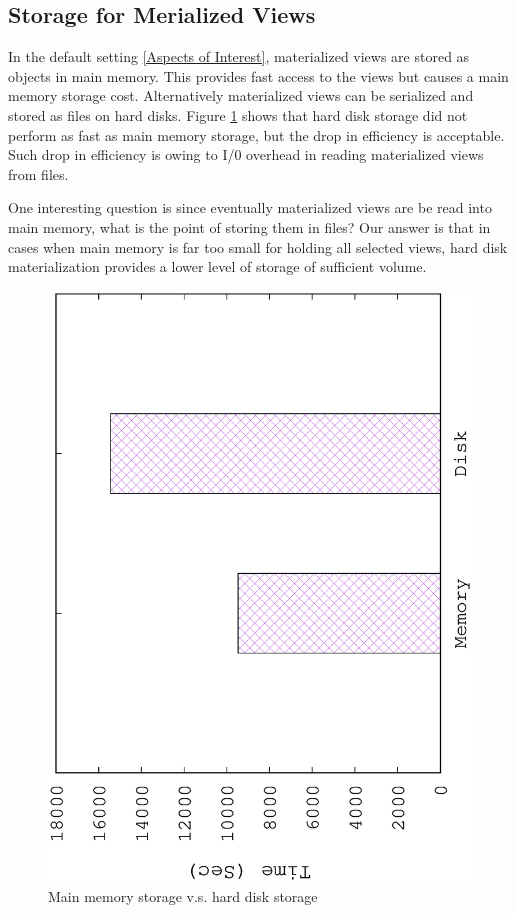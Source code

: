 \subsection{Storage for Merialized Views}
In the default setting \ref{Aspects of Interest}, materialized views are stored as objects in main memory. This provides fast access to the views but causes a main memory storage cost. Alternatively materialized views can be serialized and stored as files on hard disks. Figure \ref{fig:disk} shows that hard disk storage did not perform as fast as main memory storage, but the drop in efficiency is acceptable. Such drop in efficiency is owing to I/0 overhead in reading materialized views from files.

One interesting question is since eventually materialized views are be read into main memory, what is the point of storing them in files? Our answer is that in cases when main memory is far too small for holding all selected views, hard disk materialization provides a lower level of storage of sufficient volume.

\begin{figure}[H]
	\centering
	\includegraphics[scale=0.5, angle=270]{plot/disk}
	\caption{Main memory storage v.s. hard disk storage}
	\label{fig:disk}
\end{figure}

